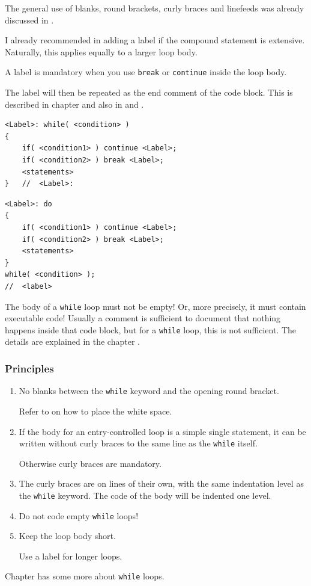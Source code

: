 The general use of blanks, round brackets, curly braces and linefeeds was already discussed in .

I already recommended in  adding a label if the compound statement is extensive. Naturally, this applies equally to a larger loop body.

A label is mandatory when you use \lstinline|break| or \lstinline|continue| inside the loop body. 

The label will then be repeated as the end comment of the code block. This is described in chapter  and also in   and .

\begin{lstlisting}
<Label>: while( <condition> )
{
    if( <condition1> ) continue <Label>;
    if( <condition2> ) break <Label>;
    <statements>
}   //  <Label>:
\end{lstlisting}
\begin{lstlisting}
<Label>: do
{
    if( <condition1> ) continue <Label>;
    if( <condition2> ) break <Label>;
    <statements>
} 
while( <condition> );
//  <label>
\end{lstlisting}

The body of a \lstinline|while| loop must not be empty! Or, more precisely, it must contain executable code! Usually a comment is sufficient to document that nothing happens inside that code block, but for a \lstinline|while| loop, this is not sufficient. The details are explained in the chapter .

\subsubsection{Principles}
\begin{enumerate}[label=P\arabic*.]
\item{No blanks between the \lstinline|while| keyword and the opening round bracket.

Refer to  on how to place the white space.}
\item{If the body for an entry-controlled loop is a simple single statement, it can be written without curly braces to the same line as the \lstinline|while| itself.

Otherwise curly braces are mandatory.}
\item{The curly braces are on lines of their own, with the same indentation level as the \lstinline|while| keyword. The code of the body will be indented one level.}
\item{Do not code empty \lstinline|while| loops!}
\item{Keep the loop body short.

Use a label for longer loops.}
\end{enumerate}

Chapter  has some more about \lstinline|while| loops.

